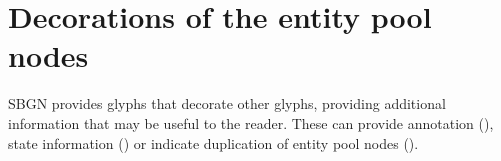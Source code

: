 







\section{Decorations of the entity pool nodes}\label{sec:decorations}

SBGN \PD provides glyphs that decorate other glyphs, providing additional information that may be useful to the reader. These can provide annotation (), state information () or indicate duplication of entity pool nodes ().





% 

% 


% 
% 
% 
% 
% 
% 

